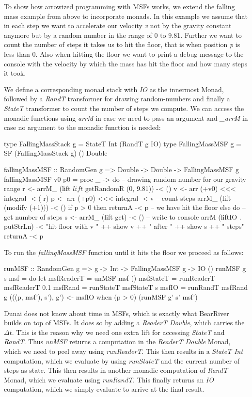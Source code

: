 To show how arrowized programming with MSFs works, we extend the falling mass example from above to incorporate monads. In this example we assume that in each step we want to accelerate our velocity \textit{v} not by the gravity constant anymore but by a random number in the range of 0 to 9.81. Further we want to count the number of steps it takes us to hit the floor, that is when position \textit{p} is less than 0. Also when hitting the floor we want to print a debug message to the console with the velocity by which the mass has hit the floor and how many steps it took.

We define a corresponding monad stack with \textit{IO} as the innermost Monad, followed by a \textit{RandT} transformer for drawing random-numbers and finally a \textit{StateT} transformer to count the number of steps we compute. We can access the monadic functions using \textit{arrM} in case we need to pass an argument and \textit{\_arrM} in case no argument to the monadic function is needed:

\begin{HaskellCode}
type FallingMassStack g = StateT Int (RandT g IO)
type FallingMassMSF g   = SF (FallingMassStack g) () Double

fallingMassMSF :: RandomGen g => Double -> Double -> FallingMassMSF g
fallingMassMSF v0 p0 = proc _ -> do
  -- drawing random number for our gravity range
  r <- arrM_ (lift $ lift $ getRandomR (0, 9.81)) -< ()
  v <- arr (+v0) <<< integral -< (-r)
  p <- arr (+p0) <<< integral -< v
  -- count steps
  arrM_ (lift (modify (+1))) -< ()
  if p > 0
    then returnA -< p
    -- we have hit the floor
    else do
      -- get number of steps
      s <- arrM_ (lift get) -< ()
      -- write to console
      arrM (liftIO . putStrLn) -< "hit floor with v " ++ show v ++ 
                                  " after " ++ show s ++ " steps"
      returnA -< p
\end{HaskellCode}

To run the \textit{fallingMassMSF} function until it hits the floor we proceed as follows:

\begin{HaskellCode}
runMSF :: RandomGen g => g -> Int -> FallingMassMSF g -> IO ()
runMSF g s msf = do
  let msfReaderT = unMSF msf ()
      msfStateT  = runReaderT msfReaderT 0.1
      msfRand    = runStateT msfStateT s
      msfIO      = runRandT msfRand g
  (((p, msf'), s'), g') <- msfIO
  when (p > 0) (runMSF g' s' msf')
\end{HaskellCode}

Dunai does not know about time in MSFs, which is exactly what BearRiver builds on top of MSFs. It does so by adding a \textit{ReaderT Double}, which carries the $\Delta t$. This is the reason why we need one extra lift for accessing \textit{StateT} and \textit{RandT}. Thus \textit{unMSF} returns a computation in the \textit{ReaderT Double} Monad, which we need to peel away using \textit{runReaderT}. This then results in a \textit{StateT Int} computation, which we evaluate by using \textit{runStateT} and the current number of steps as state. This then results in another monadic computation of \textit{RandT} Monad, which we evaluate using \textit{runRandT}. This finally returns an \textit{IO} computation, which we simply evaluate to arrive at the final result.
